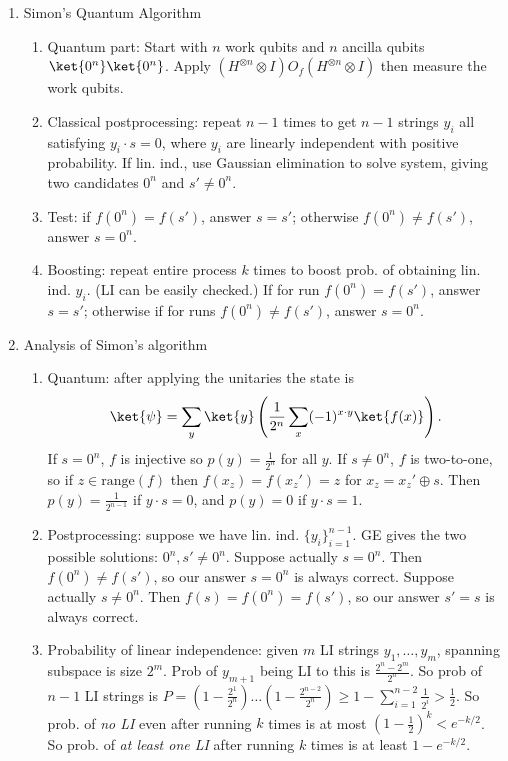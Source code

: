\begin{enumerate}
    \item Simon's Quantum Algorithm
    \begin{enumerate}
        \item Quantum part: Start with $n$ work qubits and $n$ ancilla qubits $\ket{0^n}\ket{0^n}$. Apply $(H^{\otimes n}\otimes I)O_f(H^{\otimes n} \otimes I)$ then measure the work qubits.
        \item Classical postprocessing: repeat $n-1$ times to get $n-1$ strings $y_i$ all satisfying $y_i \cdot s =0$, where $y_i$ are linearly independent with positive probability. If lin. ind., use Gaussian elimination to solve system, giving two candidates $0^n$ and $s' \neq 0^n$. 
        \item Test: if $f(0^n)=f(s')$, answer $s=s'$; otherwise $f(0^n)\neq f(s')$, answer $s=0^n$.
        \item Boosting: repeat entire process $k$ times to boost prob. of obtaining lin. ind. $y_i$. (LI can be easily checked.) If for  run $f(0^n)=f(s')$, answer $s=s'$; otherwise if for  runs $f(0^n)\neq f(s')$, answer $s=0^n$.
    \end{enumerate}
    
    \item Analysis of Simon's algorithm
    \begin{enumerate}
        \item Quantum: after applying the unitaries the state is
        \begin{align*}
            \ket{\psi} = \sum_y \ket{y} \left( \frac{1}{2^n} \sum_x (-1)^{x \cdot y} \ket{f(x)} \right).
        \end{align*}
        If $s=0^n$, $f$ is injective so $p(y) = \frac{1}{2^n}$ for all $y$. If $s \neq 0^n$, $f$ is two-to-one, so if $z \in \text{range}(f)$ then $f(x_z) = f(x_z') = z$ for $x_z = x_z' \oplus s$. Then $p(y) = \frac{1}{2^{n-1}}$ if $y \cdot s = 0$, and $p(y) = 0$ if $y \cdot s = 1$.
        \item Postprocessing: suppose we have lin. ind. $\{y_i\}_{i=1}^{n-1}$. GE gives the two possible solutions: $0^n,s'\neq 0^n$. Suppose actually $s=0^n$. Then $f(0^n)\neq f(s')$, so our answer $s=0^n$ is always correct. Suppose actually $s \neq 0^n$. Then $f(s)=f(0^n)=f(s')$, so our answer $s'=s$ is always correct.
        \item Probability of linear independence: given $m$ LI strings $y_1,\dots,y_m$, spanning subspace is size $2^m$. Prob of $y_{m+1}$ being LI to this is $\frac{2^n-2^m}{2^n}$. So prob of $n-1$ LI strings is $P=(1-\frac{2^1}{2^n})\dots(1-\frac{2^{n-2}}{2^n}) \geq 1-\sum_{i=1}^{n-2} \frac{1}{2^i} > \frac{1}{2}$. So prob. of \textit{no LI} even after running $k$ times is at most $(1-\frac{1}{2})^k < e^{-k/2}$. So prob. of \textit{at least one LI} after running $k$ times is at least $1 - e^{-k/2}$.
    \end{enumerate}
\end{enumerate}







